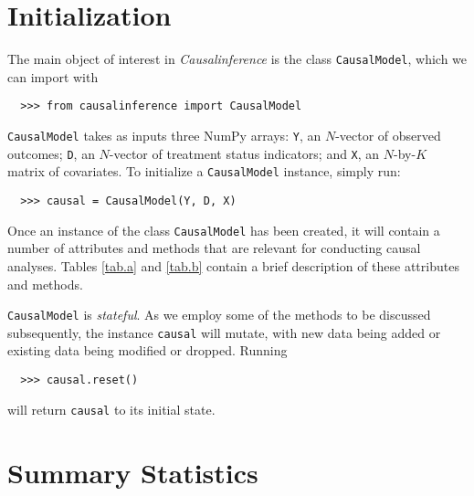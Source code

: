 \documentclass[12pt]{article}
\theoremstyle{definition}
\theoremstyle{definition}
\theoremstyle{definition}
\theoremstyle{remark}
\begin{document}

\section{Initialization} \label{sec.a}

The main object of interest in \textit{Causalinference} is the class \texttt{CausalModel}, which we can import with
\begin{verbatim}
  >>> from causalinference import CausalModel
\end{verbatim}
\texttt{CausalModel} takes as inputs three NumPy arrays: \texttt{Y}, an $N$-vector of observed outcomes; \texttt{D}, an $N$-vector of treatment status indicators; and \texttt{X}, an $N$-by-$K$ matrix of covariates. To initialize a \texttt{CausalModel} instance, simply run:
\begin{verbatim}
  >>> causal = CausalModel(Y, D, X)
\end{verbatim}

Once an instance of the class \texttt{CausalModel} has been created, it will contain a number of attributes and methods that are relevant for conducting causal analyses. Tables \ref{tab.a} and \ref{tab.b} contain a brief description of these attributes and methods.

\texttt{CausalModel} is \textit{stateful}. As we employ some of the methods to be discussed subsequently, the instance \texttt{causal} will mutate, with new data being added or existing data being modified or dropped. Running
\begin{verbatim}
  >>> causal.reset()
\end{verbatim}
will return \texttt{causal} to its initial state.


\section{Summary Statistics} \label{sec.b}
\end{document}

